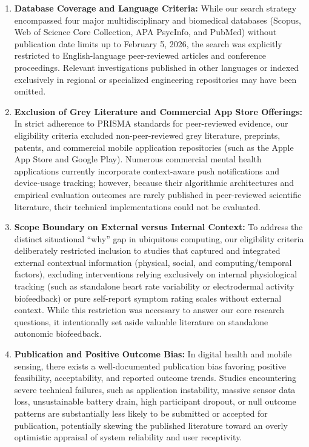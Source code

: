 \begin{enumerate}[label=\textbf{\arabic*.}]
    \item \textbf{Database Coverage and Language Criteria:} While our search strategy encompassed four major multidisciplinary and biomedical databases (Scopus, Web of Science Core Collection, APA PsycInfo, and PubMed) without publication date limits up to February 5, 2026, the search was explicitly restricted to English-language peer-reviewed articles and conference proceedings. Relevant investigations published in other languages or indexed exclusively in regional or specialized engineering repositories may have been omitted.
    
    \item \textbf{Exclusion of Grey Literature and Commercial App Store Offerings:} In strict adherence to PRISMA standards for peer-reviewed evidence, our eligibility criteria excluded non-peer-reviewed grey literature, preprints, patents, and commercial mobile application repositories (such as the Apple App Store and Google Play). Numerous commercial mental health applications currently incorporate context-aware push notifications and device-usage tracking; however, because their algorithmic architectures and empirical evaluation outcomes are rarely published in peer-reviewed scientific literature, their technical implementations could not be evaluated.
    
    \item \textbf{Scope Boundary on External versus Internal Context:} To address the distinct situational ``why'' gap in ubiquitous computing, our eligibility criteria deliberately restricted inclusion to studies that captured and integrated external contextual information (physical, social, and computing/temporal factors), excluding interventions relying exclusively on internal physiological tracking (such as standalone heart rate variability or electrodermal activity biofeedback) or pure self-report symptom rating scales without external context. While this restriction was necessary to answer our core research questions, it intentionally set aside valuable literature on standalone autonomic biofeedback.
    
    \item \textbf{Publication and Positive Outcome Bias:} In digital health and mobile sensing, there exists a well-documented publication bias favoring positive feasibility, acceptability, and reported outcome trends. Studies encountering severe technical failures, such as application instability, massive sensor data loss, unsustainable battery drain, high participant dropout, or null outcome patterns are substantially less likely to be submitted or accepted for publication, potentially skewing the published literature toward an overly optimistic appraisal of system reliability and user receptivity.
    

\end{enumerate}
